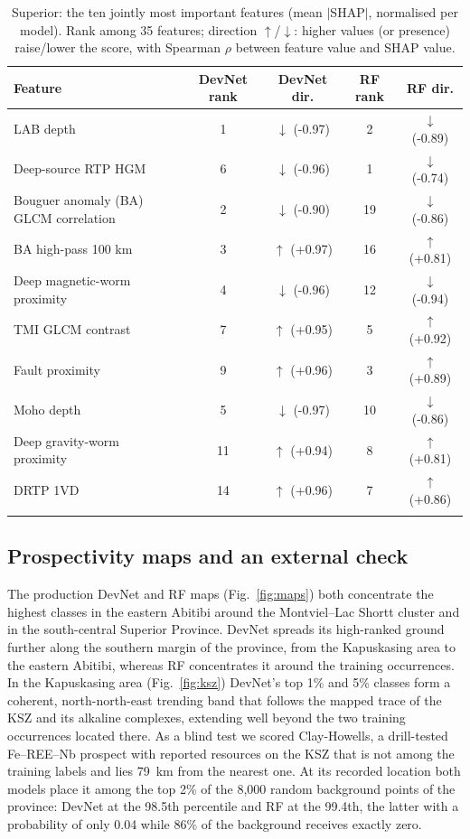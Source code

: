 \documentclass[pdflatex,sn-apa]{sn-jnl}
\begin{document}
\begin{table}[t]
\caption{Superior: the ten jointly most important features (mean $|$SHAP$|$, normalised per model). Rank among 35 features; direction $\uparrow$/$\downarrow$: higher values (or presence) raise/lower the score, with Spearman $\rho$ between feature value and SHAP value.}\label{tab:shap}
\scriptsize
\setlength{\tabcolsep}{2.5pt}
\begin{tabular*}{\textwidth}{@{\extracolsep\fill}lcccc}
\toprule
Feature & DevNet rank & DevNet dir. & RF rank & RF dir. \\
\midrule
LAB depth & 1 & $\downarrow$ (-0.97) & 2 & $\downarrow$ (-0.89) \\
Deep-source RTP HGM & 6 & $\downarrow$ (-0.96) & 1 & $\downarrow$ (-0.74) \\
Bouguer anomaly (BA) GLCM correlation & 2 & $\downarrow$ (-0.90) & 19 & $\downarrow$ (-0.86) \\
BA high-pass 100 km & 3 & $\uparrow$ (+0.97) & 16 & $\uparrow$ (+0.81) \\
Deep magnetic-worm proximity & 4 & $\downarrow$ (-0.96) & 12 & $\downarrow$ (-0.94) \\
TMI GLCM contrast & 7 & $\uparrow$ (+0.95) & 5 & $\uparrow$ (+0.92) \\
Fault proximity & 9 & $\uparrow$ (+0.96) & 3 & $\uparrow$ (+0.89) \\
Moho depth & 5 & $\downarrow$ (-0.97) & 10 & $\downarrow$ (-0.86) \\
Deep gravity-worm proximity & 11 & $\uparrow$ (+0.94) & 8 & $\uparrow$ (+0.81) \\
DRTP 1VD & 14 & $\uparrow$ (+0.96) & 7 & $\uparrow$ (+0.86) \\
\botrule
\end{tabular*}
\end{table}

\subsection{Prospectivity maps and an external check}\label{sec:res-maps}

The production DevNet and RF maps (Fig.~\ref{fig:maps}) both concentrate the highest classes in the eastern Abitibi around the Montviel--Lac Shortt cluster and in the south-central Superior Province. DevNet spreads its high-ranked ground further along the southern margin of the province, from the Kapuskasing area to the eastern Abitibi, whereas RF concentrates it around the training occurrences. In the Kapuskasing area (Fig.~\ref{fig:ksz}) DevNet's top 1\% and 5\% classes form a coherent, north-north-east trending band that follows the mapped trace of the KSZ and its alkaline complexes, extending well beyond the two training occurrences located there. As a blind test we scored Clay-Howells, a drill-tested Fe--REE--Nb prospect with reported resources on the KSZ \citep{OGS2011} that is not among the training labels and lies 79~km from the nearest one. At its recorded location both models place it among the top 2\% of the 8,000 random background points of the province: DevNet at the 98.5th percentile and RF at the 99.4th, the latter with a probability of only 0.04 while 86\% of the background receives exactly zero.
\end{document}
